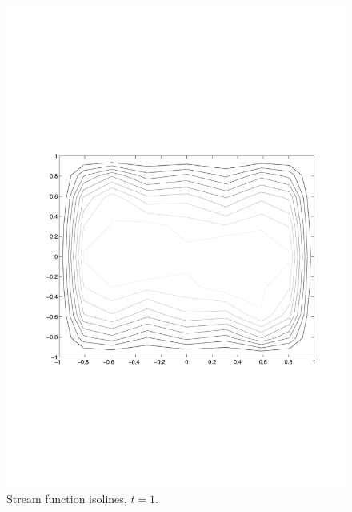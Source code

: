 \begin{multicols}{2}

\begin{figure}[H]
\centering
\includegraphics[scale=0.45, trim = 30mm 75mm 15mm 80mm, clip]{./Figures/4-IVBP/stream_t_10.pdf}
\caption{Stream function isolines, $t=1$.
}
\end{figure}


\columnbreak


\end{multicols}
